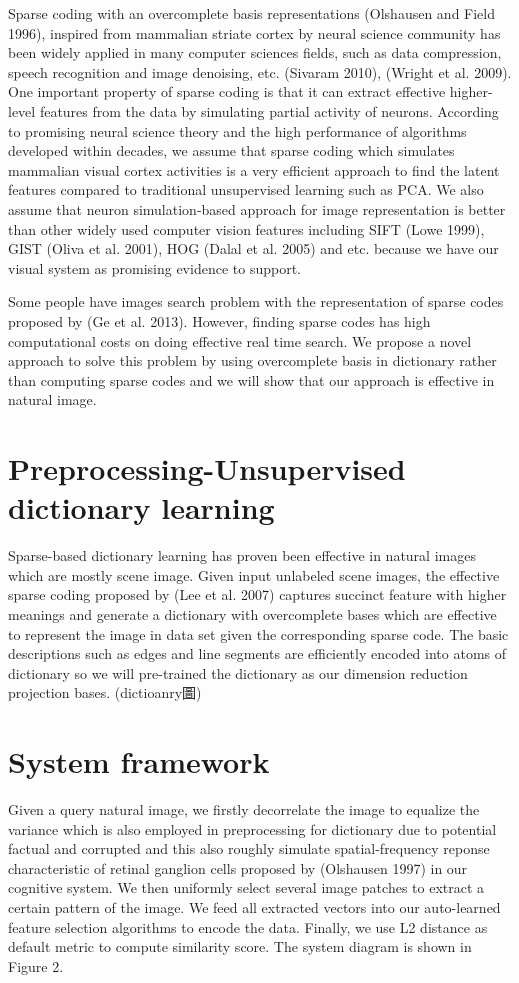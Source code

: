 \documentclass[letterpaper]{article}
\begin{document}
Sparse coding with an overcomplete basis representations (Olshausen and Field 1996), inspired from mammalian striate cortex by neural science community has been widely applied in many computer sciences fields, such as data compression, speech recognition and image denoising,  etc. (Sivaram 2010), (Wright et al. 2009).  One important property of sparse coding is that it can extract effective higher-level features from the data by simulating partial activity of neurons.  
According to promising neural science theory and the high performance of algorithms developed within decades, we assume that sparse coding which simulates mammalian visual cortex activities is a very efficient approach to find the latent features compared to traditional unsupervised learning such as PCA. We also assume that neuron simulation-based approach for image representation is better than  other widely used computer vision features including SIFT (Lowe 1999), GIST (Oliva et al. 2001), HOG (Dalal et al. 2005) and etc. because we have our visual system as promising evidence to support. 

Some people have images search problem with the representation of sparse codes proposed by (Ge et al. 2013). However, finding sparse codes has high computational costs on doing effective real time search. We propose a novel approach to solve this problem by using overcomplete basis in dictionary rather than computing sparse codes and we will show that our approach is effective in natural image. 

\section{Preprocessing-Unsupervised dictionary learning}
Sparse-based dictionary learning has proven been effective in natural images which are mostly scene image. Given input unlabeled scene images, the effective sparse coding proposed by (Lee et al. 2007) captures succinct feature with higher meanings and generate a dictionary with overcomplete bases which are effective to represent the image in data set given the corresponding sparse code. The basic descriptions such as edges and line segments are efficiently encoded into atoms of dictionary so we will pre-trained the dictionary as our dimension reduction projection bases. (dictioanry圖)

\section{System framework}
Given a query natural image, we firstly decorrelate the image to equalize the variance which is also employed in preprocessing for dictionary due to potential factual and corrupted and this also roughly simulate spatial-frequency reponse characteristic of retinal ganglion cells proposed by (Olshausen 1997) in our cognitive system.  We then uniformly select several image patches to extract a certain pattern of the image. We feed all extracted vectors into our auto-learned feature selection algorithms to encode the data. Finally, we use L2 distance as default metric to compute similarity score. The system diagram is shown in Figure 2.
\end{document}
